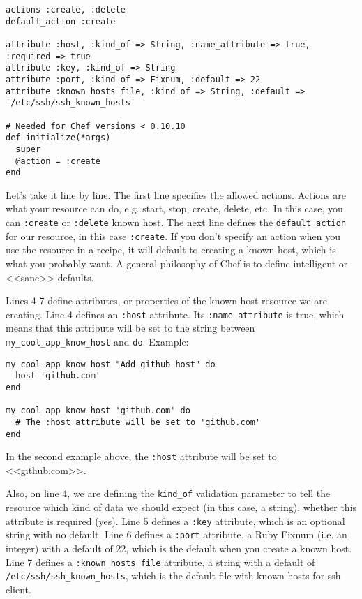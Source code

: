 \begin{lstlisting}[label=lst:cookbook-lwrp1,title=my-server-cloud/site-cookbooks/my\_cool\_app/resources/know\_host.rb]
actions :create, :delete
default_action :create

attribute :host, :kind_of => String, :name_attribute => true, :required => true
attribute :key, :kind_of => String
attribute :port, :kind_of => Fixnum, :default => 22
attribute :known_hosts_file, :kind_of => String, :default => '/etc/ssh/ssh_known_hosts'

# Needed for Chef versions < 0.10.10
def initialize(*args)
  super
  @action = :create
end
\end{lstlisting}

Let's take it line by line. The first line specifies the allowed actions. Actions are what your resource can do, e.g. start, stop, create, delete, etc. In this case, you can \lstinline!:create! or \lstinline!:delete! known host. The next line defines the \lstinline!default_action! for our resource, in this case \lstinline!:create!. If you don't specify an action when you use the resource in a recipe, it will default to creating a known host, which is what you probably want. A general philosophy of Chef is to define intelligent or <<sane>> defaults.

Lines 4-7 define attributes, or properties of the known host resource we are creating. Line 4 defines an \lstinline!:host! attribute. Its \lstinline!:name_attribute! is true, which means that this attribute will be set to the string between \lstinline!my_cool_app_know_host! and \lstinline!do!. Example:

\begin{lstlisting}[label=lst:cookbook-lwrp2]
my_cool_app_know_host "Add github host" do
  host 'github.com'
end

my_cool_app_know_host 'github.com' do
  # The :host attribute will be set to 'github.com'
end
\end{lstlisting}

In the second example above, the \lstinline!:host! attribute will be set to <<github.com>>.

Also, on line 4, we are defining the \lstinline!kind_of! validation parameter to tell the resource which kind of data we should expect (in this case, a string), whether this attribute is required (yes). Line 5 defines a \lstinline!:key! attribute, which is an optional string with no default. Line 6 defines a \lstinline!:port! attribute, a Ruby Fixnum (i.e. an integer) with a default of 22, which is the default when you create a known host. Line 7 defines a \lstinline!:known_hosts_file! attribute, a string with a default of \lstinline!/etc/ssh/ssh_known_hosts!, which is the default file with known hosts for ssh client.

